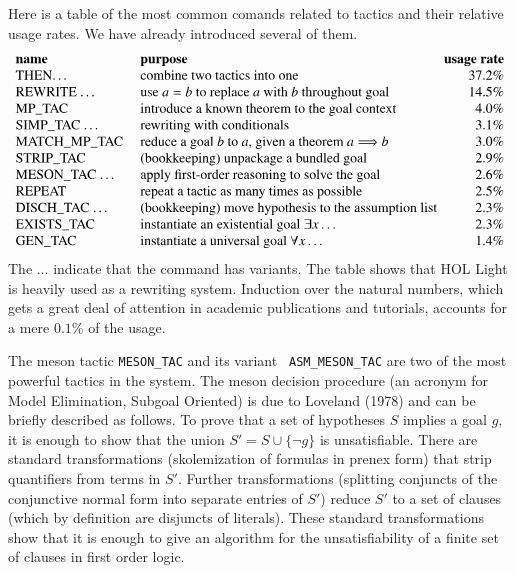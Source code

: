 \documentclass{llncs}
\begin{document}
Here is a table of the most common comands related to tactics and their relative 
usage rates.  We have already introduced several of them.
\[
\begin{array}{llr}
\text{\bf name}  &~\text{\bf purpose} &\text{\bf usage rate}\\
\text{THEN\dots }   &~\text{combine two tactics into one}   & 37.2\%\\
\text{REWRITE \dots} &~\text{use $a=b$ to replace $a$ with $b$ throughout goal} & 14.5\%\\
\text{MP\_TAC} &~\text{introduce a known theorem to the goal context} &4.0\%\\
\text{SIMP\_TAC \dots}&~\text{rewriting with conditionals} & 3.1\%\\
\text{MATCH\_MP\_TAC} &~\text{reduce a goal $b$ to $a$, given a theorem $a\Longrightarrow b$}& 3.0\%\\
\text{STRIP\_TAC} &~\text{(bookkeeping) unpackage a bundled goal} & 2.9\%\\
\text{MESON\_TAC \dots}&~\text{apply first-order reasoning to solve the goal} & 2.6\%\\
\text{REPEAT} &~\text{repeat a tactic as many times as possible} & 2.5\%\\
\text{DISCH\_TAC \dots}&~\text{(bookkeeping) move hypothesis to the assumption list\!\!\!} & 2.3\%\\
\text{EXISTS\_TAC}&~\text{instantiate an existential goal $\exists x\dots$}& 2.3\%\\
\text{GEN\_TAC}&~\text{instantiate a universal goal $\forall x\dots$}& 1.4\%
\end{array}
\]
The $\dots$ indicate that the command has variants.  The table shows
that HOL Light is heavily used as a rewriting system.  Induction over
the natural numbers, which gets a great deal of attention in academic
publications and tutorials, accounts for a mere $0.1\%$ of the usage.

The meson tactic {\tt MESON\_TAC} and its variant {\tt
  ASM\_MESON\_TAC} are two of the most powerful tactics in the system.
  The meson decision procedure (an
acronym for Model Elimination, Subgoal Oriented) is due to Loveland
(1978) and can be briefly described as follows.  To prove that a set
of hypotheses $S$ implies a goal $g$, it is enough to show that the
union $S' = S \cup \{\lnot g\}$ is unsatisfiable.  There are standard
transformations (skolemization of formulas in prenex form) that strip
quantifiers from terms in $S'$.  Further transformations (splitting
conjuncts of the conjunctive normal form into separate entries of
$S'$) reduce $S'$ to a set of clauses (which by definition are
disjuncts of literals).  These standard transformations show that it
is enough to give an algorithm for the unsatisfiability of a finite
set of clauses in first order logic.
\end{document}
